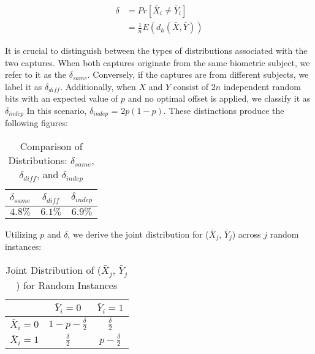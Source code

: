 \begin{equation} \label{eq:delta}
    \begin{aligned}
        \delta &= Pr[\bar{X}_i \neq \bar{Y}_i]\\
        &= \frac{1}{n}E(d_h(\bar{X}, \bar{Y}))
    \end{aligned}
\end{equation}

It is crucial to distinguish between the types of distributions associated with the two captures. When both captures originate from the same biometric subject, we refer to it as the $\delta_{same}$. Conversely, if the captures are from different subjects, we label it as $\delta_{diff}$. Additionally, when \(X\) and \(Y\) consist of \(2n\) independent random bits with an expected value of \(p\) and no optimal offset is applied, we classify it as $\delta_{indep}$ In this scenario, \(\delta_{indep}\) = \(2p(1-p)\). These distinctions produce the following figures: 

\begin{table}[H]
    \centering
    \renewcommand{\arraystretch}{1.25}\begin{tabular}{|c|c|c|}
        \hline
        $\delta_{same}$ & $\delta_{diff}$ & $\delta_{indep}$\\
        \hline
        $4.8\%$ & $6.1\%$ & $6.9\%$\\
        \hline
    \end{tabular}
\caption{Comparison of Distributions: $\delta_{same}$, $\delta_{diff}$, and $\delta_{indep}$}
\end{table}

Utilizing \hyperref[eq:p]{\(p\)} and \hyperref[eq:delta]{\(\delta\)}, we derive the joint distribution for (\(\bar{X}_j\), \(\bar{Y}_j\)) across \(j\) random instances:

\begin{table}[H]
    \centering
    \renewcommand{\arraystretch}{1.5}
    \begin{tabular}{|c|c|c|}
        \hline
        & $\bar{Y}_i = 0$ & $\bar{Y}_i = 1$\\
        \hline
        $\bar{X}_i = 0$ & $1 - p - \frac{\delta}{2}$ & $\frac{\delta}{2}$\\
        \hline
        $\bar{X}_i = 1$ & $\frac{\delta}{2}$ & $p - \frac{\delta}{2}$\\
        \hline
    \end{tabular}
    \caption{Joint Distribution of ($\bar{X}_j$, $\bar{Y}_j$) for Random Instances}
\end{table}



